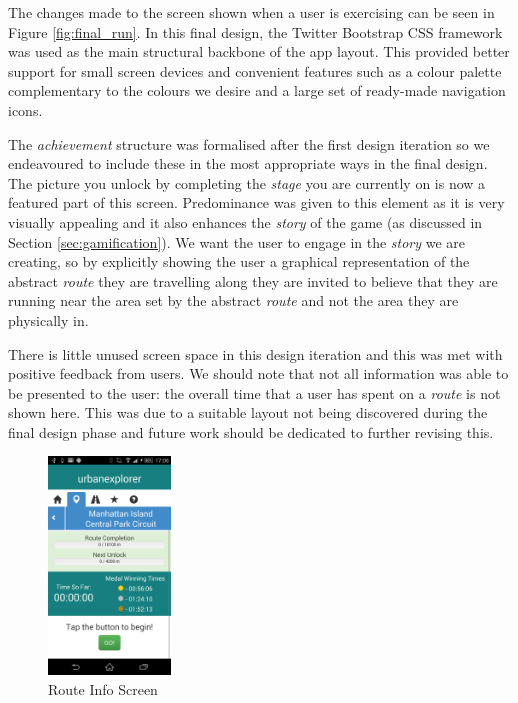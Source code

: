 The changes made to the screen shown when a user is exercising can be
seen in Figure \ref{fig:final_run}. In this final design, the Twitter
Bootstrap\cite{bootstrap} CSS framework was used as the main
structural backbone of the app layout. This provided better support
for small screen devices and convenient features such as a colour
palette complementary to the colours we desire and a large set of
ready-made navigation icons.

The \emph{achievement} structure was formalised after the first design
iteration so we endeavoured to include these in the most appropriate
ways in the final design. The picture you unlock by completing the
\emph{stage} you are currently on is now a featured part of this
screen. Predominance was given to this element as it is very visually
appealing and it also enhances the \emph{story} of the game (as
discussed in Section \ref{sec:gamification}). We want the user to
engage in the \emph{story} we are creating, so by explicitly showing
the user a graphical representation of the abstract \emph{route} they
are travelling along they are invited to believe that they are running
near the area set by the abstract \emph{route} and not the area they
are physically in. 

There is little unused screen space in this design iteration and this
was met with positive feedback from users. We should note that not all
information was able to be presented to the user: the overall time
that a user has spent on a \emph{route} is not shown here. This was
due to a suitable layout not being discovered during the final design
phase and future work should be dedicated to further revising this. 

\begin{figure}
  \vspace{-20pt}
  \centering
  \includegraphics[width=0.29\textwidth]{images/screens/route.png}
  \vspace{-20pt}
  \caption{Route Info Screen}
  \vspace{-65pt}
  \label{fig:final_route}
\end{figure}


